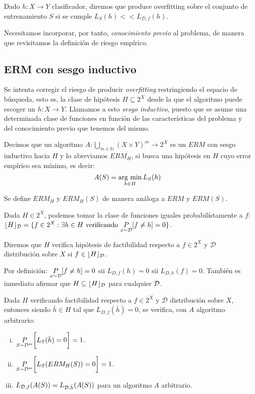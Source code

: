 \begin{definition}[Overfitting]
 Dado $h: X\rightarrow Y$ clasificador, diremos que produce overfitting sobre el conjunto de entrenamiento 
 $S$ si se cumple $L_S(h) << L_{\mathcal{D},f}(h)$.
\end{definition}

Necesitamos incorporar, por tanto, \textit{conocimiento previo} al problema, de manera que revisitamos la definición de riesgo
empírico.

\subsection{ERM con sesgo inductivo}
Se intenta corregir el riesgo de producir \emph{overfitting} restringiendo el espacio de búsqueda, esto es, la clase de 
hipótesis $H \subseteq 2^X$ desde la que el algoritmo puede escoger un $h: X\rightarrow Y$. Llamamos a esto 
\emph{sesgo inductivo}, puesto que se asume una determinada clase de funciones en función de las 
características del problema y del conocimiento previo que tenemos del mismo.

\begin{definition}
Decimos que un algoritmo $A: \underset{m\in \mathbb{N}}{\bigcup} (X\times Y)^m \rightarrow 2^{X}$ es un $ERM$ con sesgo 
inductivo hacia $H$ y lo abreviamos $ERM_H$, si busca una hipótesis en $H$ cuyo error empírico 
sea mínimo, es decir:
\[
  A(S) = \operatorname*{arg\,\min}_{h\in H} L_S(h)
\]
\end{definition}

Se define $ERM_H$ y $ERM_H(S)$ de manera análoga a $ERM$ y $ERM(S)$.

Dada $H\in 2^X$, podemos tomar la clase de funciones iguales probabilístamente a $f$:
$\lfloor H \rfloor_{\mathcal{D}} = \{f\in 2^X: \exists h\in H \textrm{ verificando }\underset{x\sim \mathcal{D}}{P}[f\neq h] = 0\}$.

\begin{definition}

Diremos que $H$ verifica hipótesis de factibilidad respecto a $f\in 2^X$ y $\mathcal{D}$ distribución sobre 
$X$ si $f\in \lfloor H \rfloor_{\mathcal{D}}$. 
\end{definition}

Por definición: $\underset{x\sim \mathcal{D}}{P}[f\neq h]=0$ sii $L_{D,f}(h) = 0$ sii $L_{D,h}(f) = 0$. También es inmediato afirmar que
$H \subseteq \lfloor H \rfloor_{\mathcal{D}}$ para cualquier $\mathcal{D}$.

\begin{fact}
Dada $H$ verificando factibilidad respecto a $f\in 2^X$ y $\mathcal{D}$ distribución sobre $X$, entonces siendo 
${\bar{h}} \in H$ tal que $L_{D,f}(\bar{h}) = 0$, se verifica, con $A$ algoritmo arbitrario:
\begin{enumerate}[i.]
\item $\underset{S\sim \mathcal{D}^m}{P} \bigg[L_S(\bar{h}) = 0 \bigg] = 1$.
\item $\underset{S\sim \mathcal{D}^m}{P} \bigg[L_S(ERM_H(S)) = 0 \bigg] = 1$.
\item $L_{\mathcal{D},f}(A(S)) = L_{\mathcal{D},\bar{h}}(A(S))$ para un algoritmo $A$ arbitrario.
\end{enumerate}
\label{fact:factibilidad}
\end{fact}


